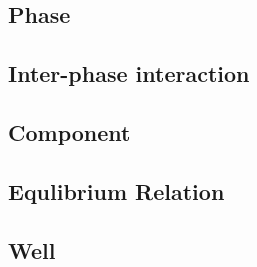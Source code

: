 \subsection{Phase}
%
\subsection{Inter-phase interaction}
%
\subsection{Component}
%
\subsection{Equlibrium Relation}
%
\subsection{Well}

